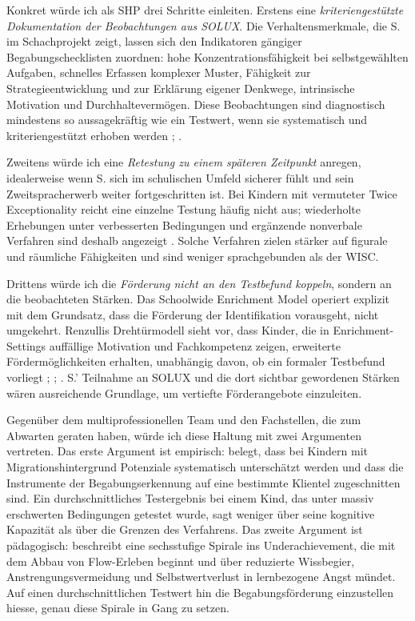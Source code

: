 \documentclass[ngerman, a4paper]{article}
\begin{document}
Konkret würde ich als SHP drei Schritte einleiten. Erstens eine
\textit{kriteriengestützte Dokumentation der Beobachtungen aus SOLUX}. Die
Verhaltensmerkmale, die S. im Schachprojekt zeigt, lassen sich den Indikatoren
gängiger Begabungschecklisten zuordnen: hohe Konzentrationsfähigkeit bei
selbstgewählten Aufgaben, schnelles Erfassen komplexer Muster, Fähigkeit zur
Strategieentwicklung und zur Erklärung eigener Denkwege, intrinsische Motivation
und Durchhaltevermögen. Diese Beobachtungen sind diagnostisch mindestens so
aussagekräftig wie ein Testwert, wenn sie systematisch und kriteriengestützt
erhoben werden \parencite[S.\,34--41]{trautmann2016einfuehrung};
\parencite[S.\,224--235]{muelleroppliger2021paeddiagnostik}.

Zweitens würde ich eine \textit{Retestung zu einem späteren Zeitpunkt} anregen,
idealerweise wenn S. sich im schulischen Umfeld sicherer fühlt und sein
Zweitspracherwerb weiter fortgeschritten ist. Bei Kindern mit vermuteter
Twice Exceptionality reicht eine einzelne Testung häufig nicht aus; wiederholte
Erhebungen unter verbesserten Bedingungen und ergänzende nonverbale Verfahren
sind deshalb angezeigt \parencite[S.\,93,\,169--172]{maehler2018diagnostik}.
Solche Verfahren zielen stärker auf figurale und räumliche Fähigkeiten und sind
weniger sprachgebunden als der WISC.

Drittens würde ich die \textit{Förderung nicht an den Testbefund koppeln}, sondern
an die beobachteten Stärken. Das Schoolwide Enrichment Model operiert explizit mit
dem Grundsatz, dass die Förderung der Identifikation vorausgeht, nicht umgekehrt.
Renzullis Drehtürmodell sieht vor, dass Kinder, die in Enrichment-Settings
auffällige Motivation und Fachkompetenz zeigen, erweiterte Fördermöglichkeiten
erhalten, unabhängig davon, ob ein formaler Testbefund vorliegt
\parencite[S.\,333--345]{reisrenzullimueller2021sem};
\parencite[S.\,104--105]{hoyer2013begabung};
\parencite[S.\,254--273]{fischer2020begabungsfoerderung}. S.'
Teilnahme an SOLUX und die dort sichtbar gewordenen Stärken wären ausreichende
Grundlage, um vertiefte Förderangebote einzuleiten.

Gegenüber dem multiprofessionellen Team und den Fachstellen, die zum Abwarten
geraten haben, würde ich diese Haltung mit zwei Argumenten vertreten. Das erste
Argument ist empirisch: \textcite[S.\,576--585]{stamm2021fehlenderblick} belegt,
dass bei Kindern mit Migrationshintergrund
Potenziale systematisch unterschätzt werden und dass die Instrumente der
Begabungserkennung auf eine bestimmte Klientel zugeschnitten sind. Ein
durchschnittliches Testergebnis bei einem Kind, das unter massiv erschwerten
Bedingungen getestet wurde, sagt weniger über seine kognitive Kapazität als über
die Grenzen des Verfahrens. Das zweite Argument
ist pädagogisch: \textcite[S.\,70--72]{lehwald2017motivation} beschreibt
eine sechsstufige Spirale ins Underachievement, die mit dem Abbau von
Flow-Erleben beginnt und über reduzierte Wissbegier, Anstrengungsvermeidung
und Selbstwertverlust in lernbezogene Angst mündet. Auf einen
durchschnittlichen Testwert hin die Begabungsförderung einzustellen hiesse,
genau diese Spirale in Gang zu setzen.
\end{document}
